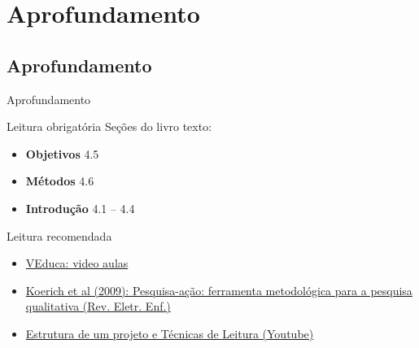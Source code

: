 \documentclass{beamer}
\begin{document}
\section{Aprofundamento}

\subsection{Aprofundamento}

\begin{frame}{Aprofundamento}
  \begin{block}{Leitura obrigatória}
    \scriptsize
    Seções do livro texto:
    \begin{itemize}
      \scriptsize
    \item {\bf Objetivos} 4.5
    \item {\bf Métodos} 4.6
    \item {\bf Introdução} 4.1 -- 4.4
    \end{itemize}
  \end{block}
  \begin{block}{Leitura recomendada}
    \begin{itemize}
      \scriptsize
    \item<1-> \href{http://www.veduca.com.br/assistir/metodologia-cientifica}
      {VEduca: video aulas}
    \item<1-> \href{http://www.veduca.com.br/assistir/metodologia-cientifica}
      {Koerich et al (2009): Pesquisa-ação: ferramenta
      metodológica para a pesquisa qualitativa (Rev. Eletr. Enf.)}
  \item<1-> \href{http://www.veduca.com.br/assistir/metodologia-cientifica}
    {Estrutura de um projeto e Técnicas de Leitura (Youtube)}
    \end{itemize}
  \end{block}
\end{frame}
\end{document}
